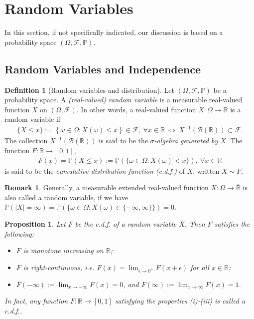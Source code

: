 \documentclass{article}
\numberwithin{equation}{section}
\renewcommand{\P}{\mathbb{P}}
\theoremstyle{plain}
\newtheorem{proposition}[theorem]{Proposition}
\theoremstyle{definition}
\newtheorem{definition}[theorem]{Definition}
\newtheorem*{remark}{Remark}
\begin{document}
\newpage
\section{Random Variables}
In this section, if not specifically indicated, our discussion is based on a probability space $(\Omega,\mathscr{F},\mathbb{P})$.
\subsection{Random Variables and Independence}
\begin{definition}[Random variables and distribution]\label{def:2.1} Let $(\Omega,\mathscr{F},\mathbb{P})$ be a probability space. A \textit{(real-valued) random variable} is a measurable real-valued function $X$ on $(\Omega,\mathscr{F})$. In other words, a real-valued function $X:\Omega\to\mathbb{R}$ is a random variable if
\begin{align*}
	\{X\leq x\}:= \left\{\omega\in\Omega:X(\omega)\leq x\right\}\in\mathscr{F},\ \forall x\in\mathbb{R}\ \Leftrightarrow\ X^{-1}\left(\mathscr{B}(\mathbb{R})\right)\subset\mathscr{F}.
\end{align*}
The collection $X^{-1}\left(\mathscr{B}(\mathbb{R})\right)$ is said to be the \textit{$\sigma$-algebra generated by $X$}. The function $F:\mathbb{R}\to[0,1]$,
\begin{align*}
	F(x)= \mathbb{P}\left(X\leq x\right) := \mathbb{P}\left(\{\omega\in\Omega:X(\omega)<x\}\right),\ \forall x\in\mathbb{R} \tag{2.1}\label{eq:2.1}
\end{align*}
is said to be the \textit{cumulative distribution function (c.d.f.)} of $X$, written $X\sim F$.
\end{definition}
\begin{remark} Generally, a measurable extended real-valued function $X:\Omega\to\overline{\mathbb{R}}$ is also called a random variable, if we have $\mathbb{P}(\vert X\vert=\infty)=\P(\{\omega\in\Omega:X(\omega)\in\{-\infty,\infty\}\})=0$.
\end{remark}
\begin{proposition}\label{prop:2.2} Let $F$ be the c.d.f. of a random variable $X$. Then $F$ satisfies the following:
\begin{itemize}
	\item[(i)] $F$ is monotone increasing on $\mathbb{R}$;
	\item[(ii)] $F$ is \textit{right-continuous}, i.e. $F(x)=\lim_{\epsilon\to 0^+}F(x+\epsilon)$ for all $x\in\mathbb{R}$;
	\item[(iii)] $F(-\infty):=\lim_{x\to-\infty}F(x)=0$, and $F(\infty):=\lim_{x\to\infty} F(x)=1$.
\end{itemize}
In fact, any function $F:\mathbb{R}\to[0,1]$ satisfying the properties (i)-(iii) is called a \textit{c.d.f.}.
\end{proposition}
\end{document}
